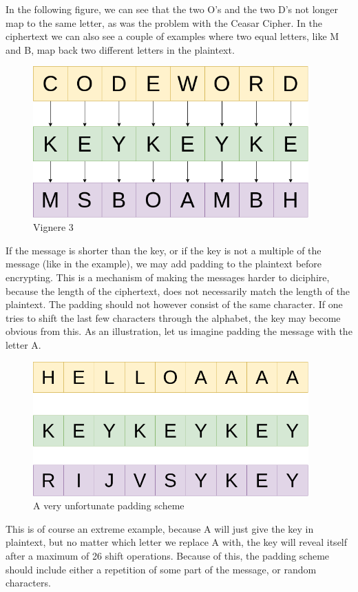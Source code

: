 \documentclass{article}
\begin{document}
In the following figure, we can see that the two O's and the two D's not longer map to the same letter, as was the problem with the Ceasar Cipher. In the ciphertext we can also see a couple of examples where two equal letters, like M and B, map back two different letters in the plaintext. 

\begin{figure}[H]
 \centering
  \includegraphics[width=300pt]{img/vigneredraw3.png}
 \caption{Vignere 3}
 \end{figure}



If the message is shorter than the key, or if the key is not a multiple of the message (like in the example), we may add padding to the plaintext before encrypting. This is a mechanism of making the messages harder to diciphire, because the length of the ciphertext, does not necessarily match the length of the plaintext. The padding should not however consist of the same character. If one tries to shift the last few characters through the alphabet, the key may become obvious from this. As an illustration, let us imagine padding the message with the letter A. 

\begin{figure}[H]
 \centering
  \includegraphics[width=300pt]{img/vigneredraw4.png}
 \caption{A very unfortunate padding scheme}
 \end{figure}

This is of course an extreme example, because A will just give the key in plaintext, but no matter which letter we replace A with, the key will reveal itself after a maximum of 26 shift operations. Because of this, the padding scheme should include either a repetition of some part of the message, or random characters. 
\end{document}
